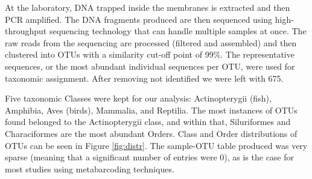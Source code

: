 At the laboratory, DNA trapped inside the membranes is extracted and then PCR amplified. The DNA fragments produced are then sequenced using high-throughput sequencing technology that can handle multiple samples at once. The raw reads from the sequencing are processed (filtered and assembled) and then clustered into OTUs with a similarity cut-off point of 99\%. The representative sequences, or the most abundant individual sequences per OTU, were used for taxonomic assignment. After removing not identified we were left with 675.

Five taxonomic Classes were kept for our analysis: Actinopterygii (fish), Amphibia, Aves (birds), Mammalia, and Reptilia. The most instances of OTUs found belonged to the Actinopterygii class, and within that, Siluriformes and Characiformes are the most abundant Orders. Class and Order distributions of OTUs can be seen in Figure \ref{fig:distr}. The sample-OTU table produced was very sparse (meaning that a significant number of entries were 0), as is the case for most studies using metabarcoding techniques. 
